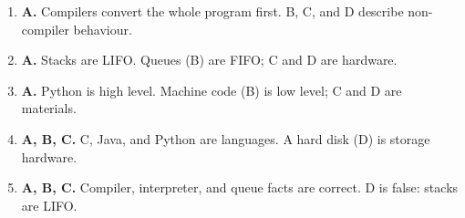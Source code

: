 \documentclass[11pt]{article}
\begin{document}
\begin{enumerate}[label=\textbf{Q\arabic*.}, leftmargin=*]
\item \textbf{A.} Compilers convert the whole program first. B, C, and D describe non-compiler behaviour.
\item \textbf{A.} Stacks are LIFO. Queues (B) are FIFO; C and D are hardware.
\item \textbf{A.} Python is high level. Machine code (B) is low level; C and D are materials.
\item \textbf{A, B, C.} C, Java, and Python are languages. A hard disk (D) is storage hardware.
\item \textbf{A, B, C.} Compiler, interpreter, and queue facts are correct. D is false: stacks are LIFO.
\end{enumerate}
\def\JKSSBLessonID{51}\def\JKSSBAnswers{1}
\end{document}
